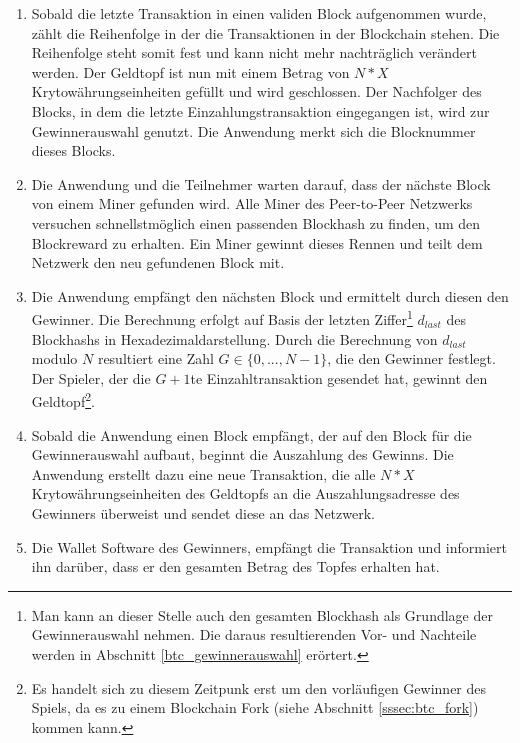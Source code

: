 \begin{enumerate}
\item  Sobald die letzte Transaktion in einen validen Block aufgenommen wurde, zählt die Reihenfolge in der die Transaktionen in der Blockchain stehen. Die Reihenfolge steht somit fest und kann nicht mehr nachträglich verändert werden. Der Geldtopf ist nun mit einem Betrag von $N*X$ Krytowährungseinheiten gefüllt und wird geschlossen. Der Nachfolger des Blocks, in dem die letzte Einzahlungstransaktion eingegangen ist, wird zur Gewinnerauswahl genutzt. Die Anwendung merkt sich die Blocknummer dieses Blocks.
\item Die Anwendung und die Teilnehmer warten darauf, dass der nächste Block von einem Miner gefunden wird. Alle Miner des Peer-to-Peer Netzwerks versuchen schnellstmöglich einen passenden Blockhash zu finden, um den Blockreward zu erhalten. Ein Miner gewinnt dieses Rennen und teilt dem Netzwerk den neu gefundenen Block mit.
\item Die Anwendung empfängt den nächsten Block und ermittelt durch diesen den Gewinner. Die Berechnung erfolgt auf Basis der letzten Ziffer\footnote{Man kann an dieser Stelle auch den gesamten Blockhash als Grundlage der Gewinnerauswahl nehmen. Die daraus resultierenden Vor- und Nachteile werden in Abschnitt \ref{btc_gewinnerauswahl} erörtert.} $d_{last}$ des Blockhashs in Hexadezimaldarstellung. Durch die Berechnung von $d_{last}$  modulo $N$ resultiert eine Zahl $G \in \{0,...,N-1\}$, die den Gewinner festlegt. Der Spieler, der die $G+1$te Einzahltransaktion gesendet hat, gewinnt den Geldtopf\footnote{Es handelt sich zu diesem Zeitpunk erst um den vorläufigen Gewinner des Spiels, da es zu einem Blockchain Fork (siehe Abschnitt \ref{sssec:btc_fork}) kommen kann. }.
\item Sobald die Anwendung einen Block empfängt, der auf den Block für die Gewinnerauswahl aufbaut, beginnt die Auszahlung des Gewinns. Die Anwendung erstellt dazu eine neue Transaktion, die alle $N*X$ Krytowährungseinheiten des Geldtopfs an die Auszahlungsadresse des Gewinners überweist und sendet diese an das Netzwerk.
\item Die Wallet Software des Gewinners, empfängt die Transaktion und informiert ihn darüber, dass er den gesamten Betrag des Topfes erhalten hat.
\end{enumerate}

